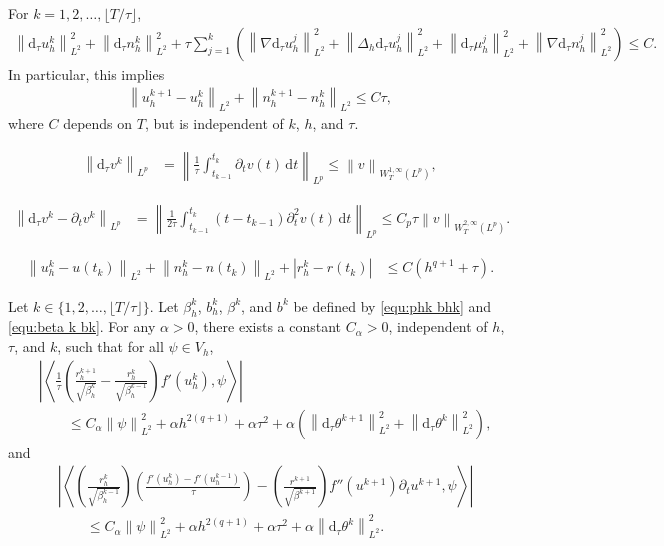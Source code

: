 \documentclass[10pt,a4paper]{amsart}
\newcommand{\abs}[1]{\left|{#1}\right|}
\newcommand{\dtt}{\mathrm{d}_\tau}
\newcommand{\dt}{\mathrm{d}t}
\newcommand{\inpro}[2]{\left\langle#1,#2\right\rangle}
\newcommand{\norm}[2]{\left\|{#1}\right\|_{#2}}
\begin{document}
\begin{lemma}
For $k=1,2,\ldots, \lfloor T/\tau \rfloor$,
	\begin{align}\label{equ:stab dtu L2}
		\norm{\dtt u_h^k}{L^2}^2
		+
		\norm{\dtt n_h^k}{L^2}^2
		+
		\tau \sum_{j=1}^k \left(\norm{\nabla \dtt u_h^j}{L^2}^2 + \norm{\Delta_h \dtt u_h^j}{L^2}^2 + \norm{\dtt \mu_h^j}{L^2}^2 + \norm{\nabla \dtt n_h^j}{L^2}^2 \right) 
		\leq C.
	\end{align}
	In particular, this implies
	\begin{align}\label{equ:stab uk1 uk L2}
		\norm{u_h^{k+1}-u_h^k}{L^2} + \norm{n_h^{k+1}-n_h^k}{L^2} \leq C\tau,
	\end{align}
	where $C$ depends on $T$, but is independent of $k$, $h$, and $\tau$.
\end{lemma}

\begin{align}\label{equ:dt vn Lp}
	\norm{\dtt v^k}{L^p}
	&=
	\norm{\frac{1}{\tau} \int_{t_{k-1}}^{t_k} \partial_t v(t) \,\dt}{L^p}
	\leq
	\norm{v}{W^{1,\infty}_T(L^p)},
\end{align}

\begin{align}
	\label{equ:dt vn min par v}
	\norm{\dtt v^k- \partial_t v^k}{L^p}
	&=
	\norm{\frac{1}{2\tau} \int_{t_{k-1}}^{t_k} (t-t_{k-1}) \partial_t^2 v(t)\,\dt}{L^p}
	\leq 
	C_p \tau \norm{v}{W^{2,\infty}_T(L^p)}.
\end{align}

\begin{align}\label{equ:error euler L2}
	\norm{u_h^k-u(t_k)}{L^2}
	+
	\norm{n_h^k-n(t_k)}{L^2}
	+
	\abs{r_h^k-r(t_k)}
	&\leq
	C(h^{q+1}+\tau).
\end{align}

\begin{lemma}
	Let $k\in\{1,2,\ldots,\lfloor T/\tau\rfloor\}$. Let $\beta_h^k$, $b_h^k$, $\beta^k$, and $b^k$ be defined by \eqref{equ:phk bhk} and \eqref{equ:beta k bk}. For any $\alpha>0$, there exists a constant $C_\alpha>0$, independent of $h$, $\tau$, and $k$, such that for all $\psi\in V_h$,
	\begin{align}
		\label{equ:pre est N5}
		&\abs{
			\inpro{
				\frac{1}{\tau}
				\left(
				\frac{r_h^{k+1}}{\sqrt{\beta_h^k}}
				-
				\frac{r_h^k}{\sqrt{\beta_h^{k-1}}}
				\right)
				f'(u_h^k)
			}{\psi}}
		\nonumber\\
		&\qquad
		\leq
		C_\alpha\norm{\psi}{L^2}^2
		+
		\alpha h^{2(q+1)}
		+
		\alpha \tau^2
		+
		\alpha\left(
		\norm{\dtt\theta^{k+1}}{L^2}^2
		+
		\norm{\dtt\theta^k}{L^2}^2
		\right),
	\end{align}
	and
	\begin{align}
		\label{equ:pre est N6}
		&\abs{
			\inpro{
				\left(\frac{r_h^k}{\sqrt{\beta_h^{k-1}}}\right)
				\left(
				\frac{f'(u_h^k)-f'(u_h^{k-1})}{\tau}
				\right)
				-
				\left(
				\frac{r^{k+1}}{\sqrt{\beta^{k+1}}}
				\right)
				f''(u^{k+1})\partial_t u^{k+1}
			}{\psi}}
		\nonumber\\
		&\qquad
		\leq
		C_\alpha \norm{\psi}{L^2}^2
		+
		\alpha h^{2(q+1)}
		+
		\alpha \tau^2
		+
		\alpha\norm{\dtt\theta^k}{L^2}^2.
	\end{align}
\end{lemma}
\end{document}

